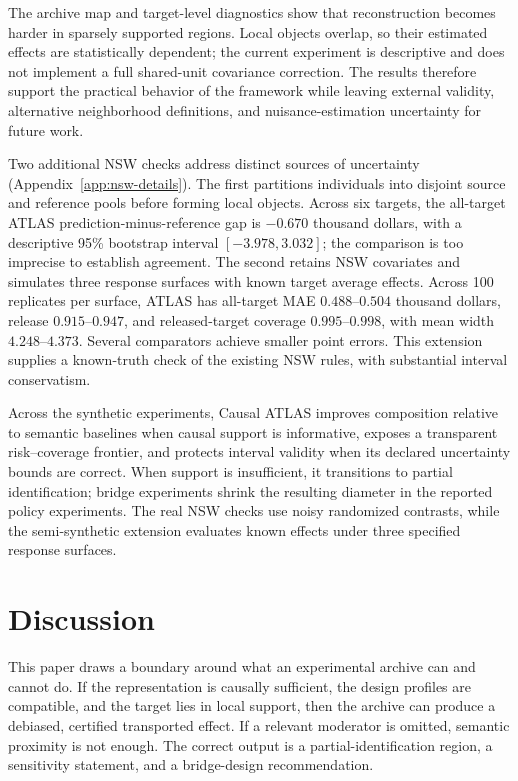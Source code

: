 \documentclass[11pt]{article}
\numberwithin{equation}{section}
\newcommand{\1}{\mathbf 1}
\begin{document}
The archive map and target-level diagnostics show that reconstruction becomes harder in sparsely supported regions.  Local objects overlap, so their estimated effects are statistically dependent; the current experiment is descriptive and does not implement a full shared-unit covariance correction.  The results therefore support the practical behavior of the framework while leaving external validity, alternative neighborhood definitions, and nuisance-estimation uncertainty for future work.

Two additional NSW checks address distinct sources of uncertainty (Appendix~\ref{app:nsw-details}). The first partitions individuals into disjoint source and reference pools before forming local objects. Across six targets, the all-target ATLAS prediction-minus-reference gap is $-0.670$ thousand dollars, with a descriptive 95\% bootstrap interval $[-3.978,3.032]$; the comparison is too imprecise to establish agreement. The second retains NSW covariates and simulates three response surfaces with known target average effects. Across 100 replicates per surface, ATLAS has all-target MAE $0.488$--$0.504$ thousand dollars, release $0.915$--$0.947$, and released-target coverage $0.995$--$0.998$, with mean width $4.248$--$4.373$. Several comparators achieve smaller point errors. This extension supplies a known-truth check of the existing NSW rules, with substantial interval conservatism.

Across the synthetic experiments, Causal ATLAS improves composition relative to semantic baselines when causal support is informative, exposes a transparent risk--coverage frontier, and protects interval validity when its declared uncertainty bounds are correct. When support is insufficient, it transitions to partial identification; bridge experiments shrink the resulting diameter in the reported policy experiments. The real NSW checks use noisy randomized contrasts, while the semi-synthetic extension evaluates known effects under three specified response surfaces.



\section{Discussion}
\label{sec:discussion}

This paper draws a boundary around what an experimental archive can and cannot do.  If the representation is causally sufficient, the design profiles are compatible, and the target lies in local support, then the archive can produce a debiased, certified transported effect.  If a relevant moderator is omitted, semantic proximity is not enough.  The correct output is a partial-identification region, a sensitivity statement, and a bridge-design recommendation.
\end{document}
